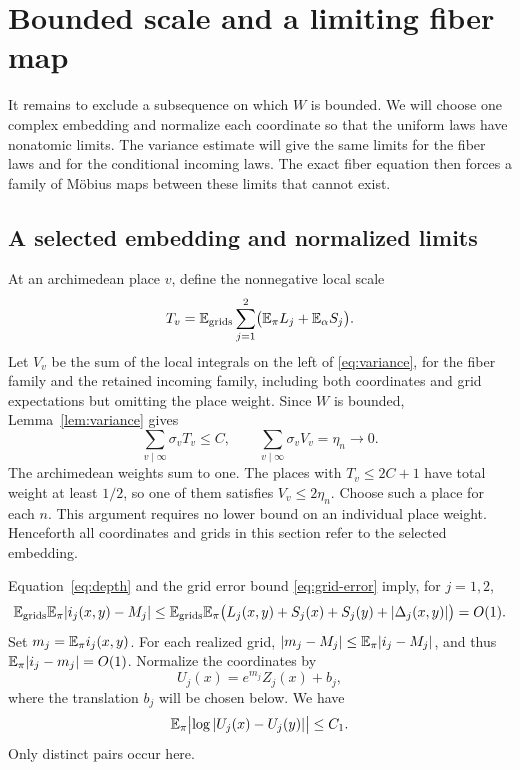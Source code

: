 \section{Bounded scale and a limiting fiber map}\label{sec:bounded}

It remains to exclude a subsequence on which $W$ is bounded.
We will choose one complex embedding and normalize each coordinate so
that the uniform laws have nonatomic limits.  The variance estimate will
give the same limits for the fiber laws and for the conditional incoming
laws.  The exact fiber equation then forces a family of M\"obius maps
between these limits that cannot exist.

\subsection{A selected embedding and normalized limits}

At an archimedean place $v$, define the nonnegative local scale
\[
 T_v=\mathbb E_{\rm grids}\sum_{j=1}^2
       \bigl(\mathbb E_\pi L_j+\mathbb E_\alpha S_j\bigr).
\]
Let $V_v$ be the sum of the local integrals on the left of
\eqref{eq:variance}, for the fiber family and the retained incoming
family, including both coordinates and grid expectations but omitting
the place weight.  Since $W$ is bounded, Lemma~\ref{lem:variance} gives
\[
 \sum_{v\mid\infty}\sigma_vT_v\le C,\qquad
 \sum_{v\mid\infty}\sigma_vV_v=\eta_n\longrightarrow0.
\]
The archimedean weights sum to one.  The places with $T_v\le2C+1$
have total weight at least $1/2$, so one of them satisfies $V_v\le2\eta_n$.
Choose such a place for each $n$.  This argument requires no lower
bound on an individual place weight.  Henceforth all coordinates and
grids in this section refer to the selected embedding.

Equation~\eqref{eq:depth} and the grid error bound
\eqref{eq:grid-error} imply, for $j=1,2$,
\[
 \mathbb E_{\rm grids}\mathbb E_\pi|i_j(x,y)-M_j|
 \le \mathbb E_{\rm grids}\mathbb E_\pi
       \bigl(L_j(x,y)+S_j(x)+S_j(y)+|\Delta_j(x,y)|\bigr)
 =O(1).
\]
Set $m_j=\mathbb E_\pi i_j(x,y)$.  For each realized grid,
$|m_j-M_j|\le\mathbb E_\pi|i_j-M_j|$, and thus
$\mathbb E_\pi|i_j-m_j|=O(1)$.  Normalize the coordinates by
\[
 U_j(x)=e^{m_j}Z_j(x)+b_j,
\]
where the translation $b_j$ will be chosen below.  We have
\begin{equation}\label{eq:bounded-log}
 \mathbb E_\pi\bigl|\log|U_j(x)-U_j(y)|\bigr|\le C_1.
\end{equation}
Only distinct pairs occur here.

